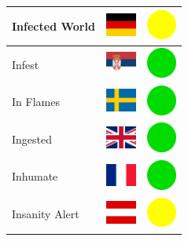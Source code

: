 \documentclass[12pt, a4paper, twoside]{report}
\begin{document}
\begin{center}
\begin{longtable}{|p{5cm}|p{2cm}|p{2cm}|}
Infected World & \includegraphics[width=1cm]{4x3/de} & \includegraphics[width=1cm]{likes/m} \\ \hline
Infest & \includegraphics[width=1cm]{4x3/rs} & \includegraphics[width=1cm]{likes/y} \\ \hline
In Flames & \includegraphics[width=1cm]{4x3/se} & \includegraphics[width=1cm]{likes/y} \\ \hline
Ingested & \includegraphics[width=1cm]{4x3/gb} & \includegraphics[width=1cm]{likes/y} \\ \hline
Inhumate & \includegraphics[width=1cm]{4x3/fr} & \includegraphics[width=1cm]{likes/y} \\ \hline
Insanity Alert & \includegraphics[width=1cm]{4x3/at} & \includegraphics[width=1cm]{likes/m} \\ \hline

\end{longtable}
\end{center}
\end{document}
